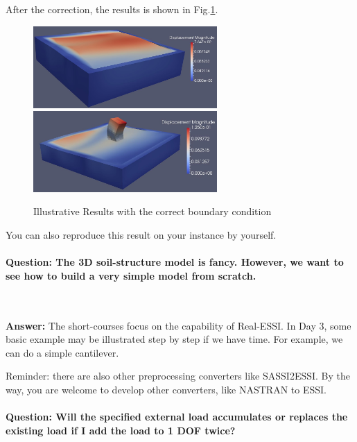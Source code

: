 After the correction, the results is shown in Fig.\ref{fig_BC_xy_ans}.
\begin{figure}[H]
  \centering
  \includegraphics[width = 7cm]{./Figure-files/QA/DRM_SW4_motion.png}
  \includegraphics[width = 7cm]{./Figure-files/QA/shell_structure_correction.png}
  \caption{Illustrative Results with the correct boundary condition}
  \label{fig_BC_xy_ans}
\end{figure}
You can also reproduce this result on your instance by yourself.




\clearpage
\newpage

\paragraph{Question: The 3D soil-structure model is fancy. However, we want to see how to build a very simple model from scratch. } ~

\textbf{Answer:} The short-courses focus on the capability of Real-ESSI. In Day 3, some basic example may be illustrated step by step if we have time. For example, we can do a simple cantilever.

Reminder: there are also other preprocessing converters like SASSI2ESSI.
By the way, you are welcome to develop other converters, like NASTRAN to ESSI.


\paragraph{Question: Will the specified external load accumulates or replaces the existing load if I add the load to 1 DOF twice?} ~

